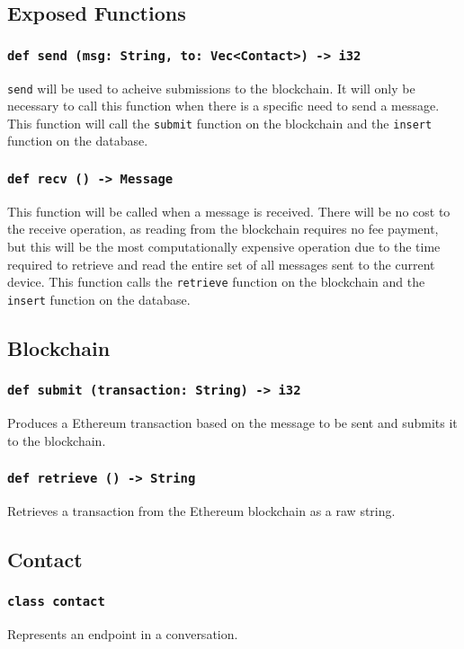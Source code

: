 \documentclass[]{article}
\begin{document}
\subsection{Exposed Functions}
\subsubsection{\texttt{def send (msg: String, to: Vec<Contact>) -> i32}}
\texttt{send} will be used to acheive submissions to the blockchain. It will only be necessary to call this function when there is a specific need to send a message. This function will call the \texttt{submit} function on the blockchain and the \texttt{insert} function on the database.
\subsubsection{\texttt{def recv () -> Message}}
This function will be called when a message is received. There will be no cost to the receive operation, as reading from the blockchain requires no fee payment, but this will be the most computationally expensive operation due to the time required to retrieve and read the entire set of all messages sent to the current device. This function calls the \texttt{retrieve} function on the blockchain and the \texttt{insert} function on the database.

\subsection{Blockchain}
\subsubsection{\texttt{def submit (transaction: String) -> i32}}
Produces a Ethereum transaction based on the message to be sent and submits it to the blockchain.
\subsubsection{\texttt{def retrieve () -> String}}
Retrieves a transaction from the Ethereum blockchain as a raw string.

\subsection{Contact}
\subsubsection{\texttt{class contact}}
Represents an endpoint in a conversation.
\end{document}
